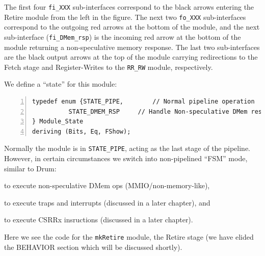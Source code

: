 The first four \verb|fi_XXX| sub-interfaces correspond to the black
arrows entering the Retire module from the left in the figure.  The
next two \verb|fo_XXX| sub-interfaces correspond to the outgoing red
arrows at the bottom of the module, and the next sub-interface
(\verb|fi_DMem_rsp|) is the incoming red arrow at the bottom of the
module returning a non-speculative memory response.  The last two
sub-interfaces are the black output arrows at the top of the module
carrying redirections to the Fetch stage and Register-Writes to the
\verb|RR_RW| module, respectively.

We define a ``state'' for this module:

{\small
\begin{Verbatim}[frame=single, numbers=left, label=(In file:src\_Fife/S5\_Retire.bsv)]
typedef enum {STATE_PIPE,        // Normal pipeline operation
	      STATE_DMEM_RSP     // Handle Non-speculative DMem response
} Module_State
deriving (Bits, Eq, FShow);
\end{Verbatim}
}

Normally the module is in \verb|STATE_PIPE|, acting as the last stage
of the pipeline.  However, in certain circumstances we switch into
non-pipelined ``FSM'' mode, similar to Drum:

\begin{tightlist}

\item to execute non-speculative DMem ops (MMIO/non-memory-like),

\item to execute traps and interrupts (discussed in a later chapter), and

\item to execute CSRRx insructions  (discussed in a later chapter).

\end{tightlist}

Here we see the code for the \verb|mkRetire| module, the Retire stage
(we have elided the BEHAVIOR section which will be discussed shortly).

